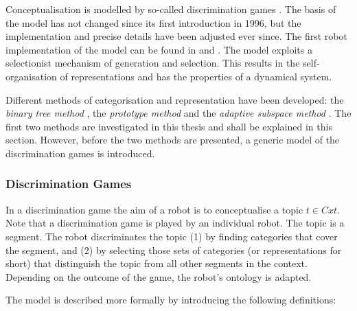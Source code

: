 Conceptualisation is modelled by so-called discrimination games \cite{steels:1996b}. The basis of the model has not changed since its first introduction in 1996, but the implementation and precise details have been adjusted ever since. The first robot implementation of the model can be found in \cite{steelsvogt:1997} and \cite{vogt:1998a}. The model exploits a selectionist mechanism of generation and selection. This results in the self-organisation of representations and has the properties of a dynamical system.

Different methods of categorisation and representation have been developed: the {\em binary tree method} \cite{steels:1996b}, the {\em prototype method} \cite{dejongvogt:1998,vogt:1998b} and the {\em adaptive subspace method} \cite{dejongvogt:1998,dejong:2000}. The first two methods are investigated in this thesis and shall be explained in this section. However, before the two methods are presented, a generic model of the discrimination games is introduced.


\subsubsection{Discrimination Games}

\p
In a discrimination game the aim of a robot is to conceptualise a topic $t \in Cxt$. Note that a discrimination game is played by an individual robot. The topic is a segment. The robot discriminates the topic (1) by finding categories that cover the segment, and (2) by selecting those sets of categories (or representations for short) that distinguish the topic from all other segments in the context. Depending on the outcome of the game, the robot's ontology is adapted.

The model is described more formally by introducing the following definitions:

